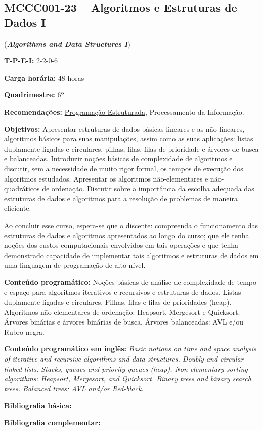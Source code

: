 \documentclass[class=article, crop=false]{standalone}
\begin{document}
\subsection*{MCCC001-23 -- Algoritmos e Estruturas de Dados I}
\label{disc:aedI}

(\textbf{\textit{Algorithms and Data Structures I}})

\begin{center}
    \begin{minipage}{0.85\textwidth}
        \textbf{T-P-E-I:} 2-2-0-6
        
        \textbf{Carga horária:} 48 horas
        
        \textbf{Quadrimestre:} 6º
        
        \textbf{Recomendações:} 
        \hyperref[disc:pe]{Programação Estruturada},
        Processamento da Informação.
    \end{minipage}
\end{center}

\textbf{Objetivos:}
Apresentar estruturas de dados básicas lineares e as não-lineares, algoritmos
básicos para suas manipulações, assim como as suas aplicações: listas
duplamente ligadas e circulares, pilhas, filas, filas de prioridade e árvores
de busca e balanceadas. Introduzir noções básicas de complexidade de algoritmos
e discutir, sem a necessidade de muito rigor formal, os tempos de execução dos
algoritmos estudados. Apresentar os algoritmos não-elementares e
não-quadráticos de ordenação. Discutir sobre a importância da escolha adequada
das estruturas de dados e algoritmos para a resolução de problemas de maneira
eficiente.

Ao concluir esse curso, espera-se que o discente: compreenda o funcionamento
das estruturas de dados e algoritmos apresentados ao longo do curso; que ele
tenha noções dos custos computacionais envolvidos em tais operações e que tenha
demonstrado capacidade de implementar tais algoritmos e estruturas de dados em
uma linguagem de programação de alto nível.

\textbf{Conteúdo programático:}
Noções básicas de análise de complexidade de tempo e espaço para algoritmos
iterativos e recursivos e estruturas de dados.
Listas duplamente ligadas e circulares.
Pilhas, filas e filas de prioridades (heap).
Algoritmos não-elementares de ordenação: Heapsort, Mergesort e Quicksort.
Árvores binárias e árvores binárias de busca.
Árvores balanceadas: AVL e/ou Rubro-negra. 

\textbf{Conteúdo programático em inglês:}
\textit{Basic notions on time and space analysis of iterative and recursive
algorithms and data structures.
Doubly and circular linked lists.
Stacks, queues and priority queues (heap).
Non-elementary sorting algorithms: Heapsort, Mergesort, and Quicksort.
Binary trees and binary search trees.
Balanced trees: AVL and/or Red-black.}

\newrefsection
\textbf{Bibliografia básica:}
\nocite{1998-sedgewick, 2010-szwarcfiter-markenzon, 2012-cormen-etal}
\printbibliography

\newrefsection
\textbf{Bibliografia complementar:}
\nocite{2007-ziviani, 1995-tenenbaum-etal, 1997-schildt, 2009-feofiloff, 2011-sedgewick-wayne}
\printbibliography
\end{document}
